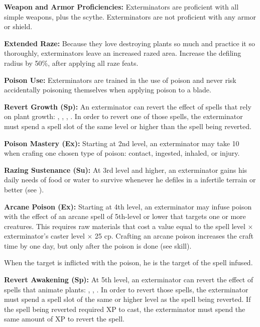 {
\textbf{Weapon and Armor Proficiencies:} Exterminators are proficient with all simple  weapons, plus the scythe. Exterminators are not proficient with any armor or shield.

\textbf{Extended Raze:} Because they love destroying plants so much and practice it so thoroughly, exterminators leave an increased razed area. Increase the defiling radius by 50\%, after applying all raze feats.

\textbf{Poison Use:} Exterminators are trained in the use of poison and never risk accidentally poisoning themselves when applying poison to a blade.

\textbf{Revert Growth (Sp):} An exterminator can revert the effect of spells that rely on plant growth: , , , . In order to revert one of those spells, the exterminator must spend a spell slot of the same level or higher than the spell being reverted.

\textbf{Poison Mastery (Ex):} Starting at 2nd level, an exterminator may take 10 when crafing one chosen type of poison: contact, ingested, inhaled, or injury.

\textbf{Razing Sustenance (Su):} At 3rd level and higher, an exterminator gains his daily needs of food or water to survive whenever he defiles in a infertile terrain or better (see ).

\textbf{Arcane Poison (Ex):} Starting at 4th level, an exterminator may infuse poison with the effect of an arcane spell of 5th-level or lower that targets one or more creatures. This requires raw materials that cost a value equal to the spell level $\times$ exterminator's caster level $\times$ 25 cp. Crafting an arcane poison increases the craft time by one day, but only after the poison is done (see  skill).

When the target is inflicted with the poison, he is the target of the spell infused.

\textbf{Revert Awakening (Sp):} At 5th level, an exterminator can revert the effect of spells that animate plants: , , . In order to revert those spells, the exterminator must spend a spell slot of the same or higher level as the spell being reverted. If the spell being reverted required XP to cast, the exterminator must spend the same amount of XP to revert the spell.
}